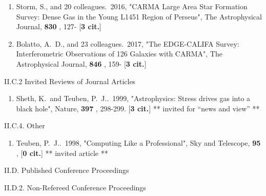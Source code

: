 \documentclass[11pt,letterpaper]{article}
\begin{document}
\begin{enumerate}[resume,label=\textbf{\arabic*}.]
\item  
Storm, S., and 20 colleagues.\  2016,  "CARMA Large Area Star Formation 
Survey: Dense Gas in the Young L1451 Region of Perseus", The Astrophysical 
Journal,  {\bf 830} , 127- [{\bf 3 cit.}] 

\item  
Bolatto, A.~D., and 23 colleagues.\  2017,  "The EDGE-CALIFA Survey: 
Interferometric Observations of 126 Galaxies with CARMA", The Astrophysical 
Journal,  {\bf 846} , 159- [{\bf 3 cit.}] 


\end{enumerate}


II.C.2  Invited Reviews of Journal Articles


\begin{enumerate}[resume,label=\textbf{\arabic*}.]

\item  
Sheth, K.~and Teuben, P.~J..\  1999,  "Astrophysics:  Stress drives gas 
into a black hole", Nature,  {\bf 397} , 298-299.  [{\bf 3 cit.}] 
** invited for ``news and view'' **

\end{enumerate}


II.C.4. Other


\begin{enumerate}[resume,label=\textbf{\arabic*}.]
  
\item  
Teuben, P.~J..\  1998,  "Computing Like a Professional", Sky and Telescope,  
{\bf 95} ,  [{\bf 0 cit.}] 
** invited article **
  
\end{enumerate}
                

II.D. Published Conference Proceedings


II.D.2. Non-Refereed Conference Proceedings

\end{document}
